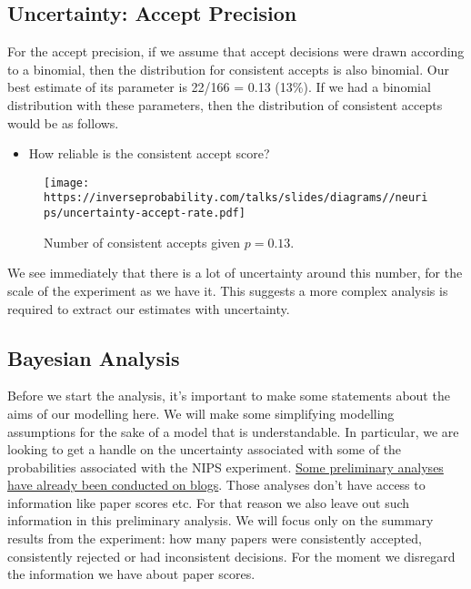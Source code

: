 \documentclass[a4paperpaper,]{article}
\providecommand{\tightlist}{%
  \setlength{\itemsep}{0pt}\setlength{\parskip}{0pt}}
\begin{document}
\hypertarget{uncertainty-accept-precision}{%
\subsection{Uncertainty: Accept
Precision}\label{uncertainty-accept-precision}}

For the accept precision, if we assume that accept decisions were drawn
according to a binomial, then the distribution for consistent accepts is
also binomial. Our best estimate of its parameter is 22/166 = 0.13
(13\%). If we had a binomial distribution with these parameters, then
the distribution of consistent accepts would be as follows.

\begin{itemize}
\tightlist
\item
  How reliable is the consistent accept score?
\end{itemize}

\begin{figure}[htb]
\texttt{[image: https://inverseprobability.com/talks/slides/diagrams//neurips/uncertainty-accept-rate.pdf]}


\caption{Number of consistent accepts given $p=0.13$.}
\label{uncertainty-accept-precision}
\end{figure}

We see immediately that there is a lot of uncertainty around this
number, for the scale of the experiment as we have it. This suggests a
more complex analysis is required to extract our estimates with
uncertainty.

\hypertarget{bayesian-analysis}{%
\subsection{Bayesian Analysis}\label{bayesian-analysis}}

Before we start the analysis, it's important to make some statements
about the aims of our modelling here. We will make some simplifying
modelling assumptions for the sake of a model that is understandable. In
particular, we are looking to get a handle on the uncertainty associated
with some of the probabilities associated with the NIPS experiment.
\href{http://inverseprobability.com/2015/01/16/blogs-on-the-nips-experiment/}{Some
preliminary analyses have already been conducted on blogs}. Those
analyses don't have access to information like paper scores etc. For
that reason we also leave out such information in this preliminary
analysis. We will focus only on the summary results from the experiment:
how many papers were consistently accepted, consistently rejected or had
inconsistent decisions. For the moment we disregard the information we
have about paper scores.
\end{document}
